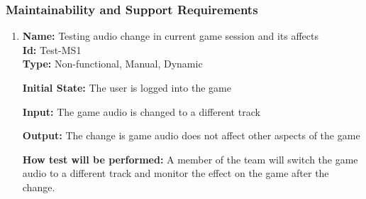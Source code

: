 \documentclass[12pt, titlepage]{article}
\begin{document}
\subsubsection{Maintainability and Support Requirements}
\begin{enumerate}
\item{\textbf{Name:} Testing audio change in current game session and its affects\\}\label{Test-MS1}
\textbf{Id:} Test-MS1\\

\textbf{Type:} Non-functional, Manual, Dynamic
					
\textbf{Initial State:} The user is logged into the game
					
\textbf{Input:} The game audio is changed to a different track 
					
\textbf{Output:} The change is game audio does not affect other aspects of the game
					
\textbf{How test will be performed:} A member of the team will switch the game audio to a different track and monitor the effect on the game after the change.
\end{enumerate}
\end{document}
